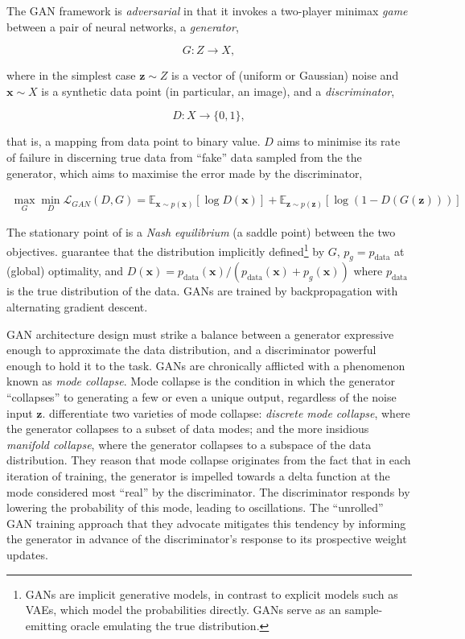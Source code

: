 The GAN framework is \emph{adversarial} in that it invokes a two-player minimax \emph{game} between a pair of neural networks, a \emph{generator},

\begin{equation}
G : Z \to X,
\end{equation}

where in the simplest case $\mathbf{z} \sim Z$ is a vector of (uniform or Gaussian) noise and $\mathbf{x} \sim X$ is a synthetic data point (in particular, an image), and a \emph{discriminator},

\begin{equation}
D : X \to \{0, 1\},
\end{equation}

that is, a mapping from data point to binary value. $D$ aims to minimise its rate of failure in discerning true data from ``fake'' data sampled from the the generator, which aims to maximise the error made by the discriminator,

\begin{align}
\max_G\min_D\mathcal{L}_{GAN}(D, G) = \mathbb{E}_{\mathbf{x} \sim p(\mathbf{x})}[\log D(\mathbf{x})] + \mathbb{E}_{\mathbf{z} \sim p(\mathbf{z})}[\log(1 - D(G(\mathbf{z})))]
\end{align}

The stationary point of is a \emph{Nash equilibrium} (a saddle point) between the two objectives. \cite{goodfellow2014generative} guarantee that the distribution implicitly defined\footnote{GANs are implicit generative models, in contrast to explicit models such as VAEs, which model the probabilities directly. GANs serve as an sample-emitting oracle emulating the true distribution.} by $G$, $p_g = p_{\text{data}}$ at (global) optimality, and $D(\mathbf{x}) = p_{\text{data}}(\mathbf{x})/(p_{\text{data}}(\mathbf{x}) + p_{g}(\mathbf{x}))$ where $p_{\text{data}}$ is the true distribution of the data. GANs are trained by backpropagation with alternating gradient descent.

GAN architecture design must strike a balance between a generator expressive enough to approximate the data distribution, and a discriminator powerful enough to hold it to the task. GANs are chronically afflicted with a phenomenon known as \emph{mode collapse}. Mode collapse is the condition in which the generator ``collapses'' to generating a few or even a unique output, regardless of the noise input $\mathbf{z}$. \cite{metz2016unrolled} differentiate two varieties of mode collapse: \emph{discrete mode collapse}, where the generator collapses to a subset of data modes; and the more insidious \emph{manifold collapse}, where the generator collapses to a subspace of the data distribution. They reason that mode collapse originates from the fact that in each iteration of training, the generator is impelled towards a delta function at the mode considered most ``real'' by the discriminator. The discriminator responds by lowering the probability of this mode, leading to oscillations. The ``unrolled'' GAN training approach that they advocate mitigates this tendency by informing the generator in advance of the discriminator's response to its prospective weight updates.

